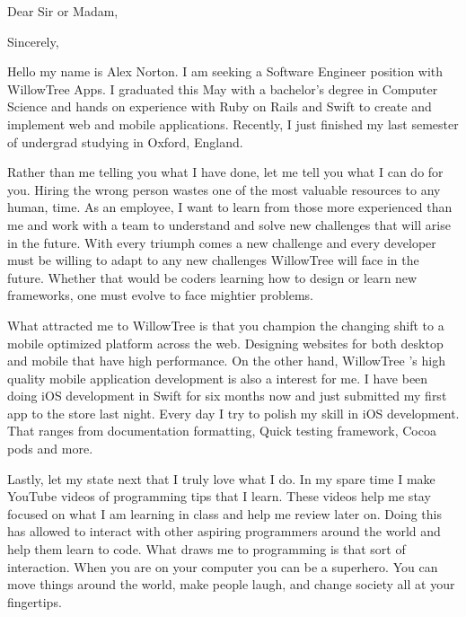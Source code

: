 \documentclass{my_cv}
\begin{document}
\newcommand{\companyName}{WillowTree } %
\newcommand{\jobTitle}{Software Engineer }
\recipient{\companyName \ Recruitment team}{\companyName }
\date{\today}
\opening{Dear Sir or Madam,}
\closing{Sincerely,}
\makelettertitle


\indent Hello my name is Alex Norton.   I am seeking a \jobTitle
position with \companyName Apps.  I graduated this May with a bachelor’s degree in
Computer Science and hands on experience with Ruby on Rails and Swift to create and
implement web and mobile applications.  Recently, I just finished my last
semester of undergrad studying in Oxford, England. 

Rather than me telling you what I have done, let me tell you what I can do for
you.  Hiring the wrong person wastes one of the most valuable resources to any
human, time.  As an employee, I want to learn from those more experienced 
than me and work with a team to understand and solve new challenges that will 
arise in the future.  With every triumph comes a new challenge and every 
developer must be willing to adapt to any new challenges \companyName will 
face in the future.  Whether that would be coders learning how to design or
learn new frameworks, one must evolve to face mightier problems.

What attracted me to \companyName is that you champion the changing shift 
to a mobile optimized platform across the web.  Designing websites for both 
desktop and mobile that have high performance.  On the other hand, \companyName's high quality mobile
application development is also a interest for me.  I have been doing iOS development 
in Swift for six months now and just submitted my first app to the store last
night.  Every day I try to polish my skill in iOS development.  That ranges from
documentation formatting, Quick testing framework, Cocoa pods and more.

Lastly, let my state next that I truly love what I do.  In my spare time
I make YouTube videos of programming tips that I learn.  These videos
help me stay focused on what I am learning in class and help me review
later on.  Doing this has allowed to interact with other aspiring
programmers around the world and help them learn to code.  What draws me
to programming is that sort of interaction.  When you are on your
computer you can be a superhero.  You can move things around the world,
make people laugh, and change society all at your fingertips.
\end{document}
